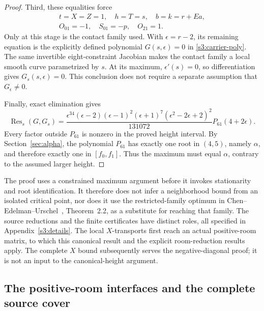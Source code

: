 \documentclass[11pt,reqno]{amsart}
\theoremstyle{definition}
\theoremstyle{remark}
\begin{document}
\begin{proof}
Third, these equalities force
\[
\begin{gathered}
 t=X=Z=1,\quad h=T=s,\quad b=k=r+Ea,\\
 O_{01}=-1,\quad S_{01}=-p,\quad O_{21}=1.
\end{gathered}
\]
Only at this stage is the contact family used.
With \(\epsilon=r-2\), its remaining equation is the explicitly
defined polynomial \(G(s,\epsilon)=0\) in \eqref{s3:carrier-poly}.
The same invertible eight-constraint Jacobian makes the contact
family a local smooth curve parametrized by \(s\).
At its maximum, \(\epsilon'(s)=0\), so differentiation gives
\(G_s(s,\epsilon)=0\). This conclusion does not require a separate
assumption that \(G_\epsilon\ne0\).

Finally, exact elimination gives
\[
 \operatorname{Res}_s(G,G_s)=
 \frac{\epsilon^{34}(\epsilon-2)(\epsilon-1)^2(\epsilon+1)^7
       (\epsilon^2-2\epsilon+2)^2}{131072}
 P_{61}(4+2\epsilon).
\]
Every factor outside \(P_{61}\) is nonzero in the proved height
interval. By Section~\ref{sec:alpha}, the polynomial \(P_{61}\) has
exactly one root in \((4,5)\), namely \(\alpha\), and therefore
exactly one in \([f_0,f_1]\). Thus the maximum must equal \(\alpha\), contrary to the
assumed larger height.
\end{proof}

The proof uses a constrained maximum argument before it invokes
stationarity and root identification. It therefore does not infer a
neighborhood bound from an isolated critical point, nor does it use
the restricted-family optimum in
Chen--Edelman--Urschel~\cite{ChenEdelmanUrschel2026}, Theorem~2.2,
as a substitute for reaching that family. The source reductions and
the finite certificates have distinct roles, all specified in
Appendix~\ref{s3:details}. The local \(X\)-transports first reach
an actual positive-room matrix, to which this canonical result and
the explicit room-reduction results apply. The complete \(X\)
bound subsequently serves the negative-diagonal proof; it is not an
input to the canonical-height argument.


\subsection{The positive-room interfaces and the complete source cover}
\label{x:room-interface}
\end{document}
